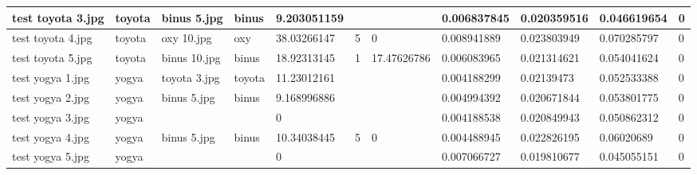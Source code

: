 \begin{landscape}
\begin{longtable}{|p{2cm}|p{1.5cm}|p{2cm}|p{1.5cm}|p{2cm}|p{1cm}|p{2cm}|p{2cm}|p{2cm}|p{2cm}|p{1cm}|}
		test toyota 3.jpg    & toyota           & binus 5.jpg           & binus                       & 9.203051159           &                         &                            & 0.006837845           & 0.020359516           & 0.046619654              & 0                \\ \hline
		test toyota 4.jpg    & toyota           & oxy 10.jpg            & oxy                         & 38.03266147           & 5                       & 0                          & 0.008941889           & 0.023803949           & 0.070285797              & 0                \\ \hline
		test toyota 5.jpg    & toyota           & binus 10.jpg          & binus                       & 18.92313145           & 1                       & 17.47626786                & 0.006083965           & 0.021314621           & 0.054041624              & 0                \\ \hline
		test yogya 1.jpg     & yogya            & toyota 3.jpg          & toyota                      & 11.23012161           &                         &                            & 0.004188299           & 0.02139473            & 0.052533388              & 0                \\ \hline
		test yogya 2.jpg     & yogya            & binus 5.jpg           & binus                       & 9.168996886           &                         &                            & 0.004994392           & 0.020671844           & 0.053801775              & 0                \\ \hline
		test yogya 3.jpg     & yogya            &                       &                             & 0                     &                         &                            & 0.004188538           & 0.020849943           & 0.050862312              & 0                \\ \hline
		test yogya 4.jpg     & yogya            & binus 5.jpg           & binus                       & 10.34038445           & 5                       & 0                          & 0.004488945           & 0.022826195           & 0.06020689               & 0                \\ \hline
		test yogya 5.jpg     & yogya            &                       &                             & 0                     &                         &                            & 0.007066727           & 0.019810677           & 0.045055151              & 0                \\ \hline
	\end{longtable}
\end{landscape}